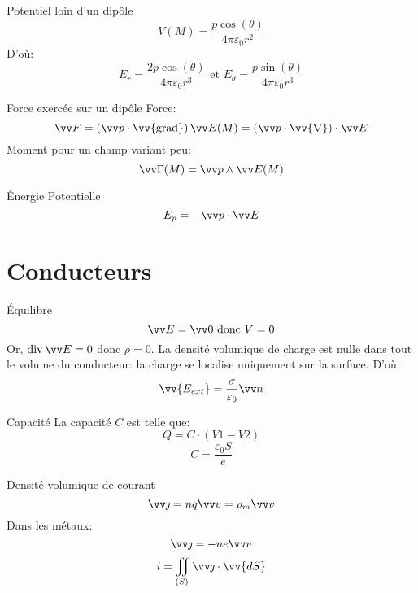 \documentclass[french, a4paper, 11pt, twocolumn]{article}
\newcommand{\po}{\left(}         %
\newcommand{\pf}{\right)}        %
\newcommand{\pof}[1]{\po #1 \pf} %
\newcommand{\vect}[1]{\vv{#1}}
\newcommand{\vabla}{\vect{\nabla}}    %
\newcommand{\grad}{\vect{\mathrm{grad}}}  %
\DeclareMathOperator{\diverg}{div}        %
\begin{document}
\begin{cadre}{Potentiel loin d'un dipôle}
  \[V(M) = \dfrac{p\cos(\theta)}{4\pi\varepsilon_{0}r^{2}}\]
  D'où:
  \[E_{r} = \dfrac{2p\cos(\theta)}{4\pi\varepsilon_{0}r^{3}}\text{ et } E_{\theta} = \dfrac{p\sin(\theta)}{4\pi\varepsilon_{0}r^{3}}\]
\end{cadre}

\begin{cadre}{Force exercée sur un dipôle}
  Force:
  \[\vv F = \pof{\vv p \cdot \grad}\vv E(M) = \po\vv p\cdot\vabla\pf\cdot\vv E\]
  Moment pour un champ variant peu:
  \[\vv\Gamma(M) = \vv p \wedge \vv E(M)\]
\end{cadre}

\begin{cadre}{Énergie Potentielle}
  \[E_{p} = -\vv p\cdot \vv E\]
\end{cadre}

\section{Conducteurs}
\begin{cadre}{Équilibre}
  \[\vv E = \vv 0 \text{ donc } V = 0\]
  Or, $\diverg \vv E = 0$ donc $\rho = 0$. La densité volumique de charge est nulle dans tout le volume du conducteur: la charge se localise uniquement sur la surface.
  D'où:
  \[\vv {E_{ext}} = \dfrac{\sigma}{\varepsilon_{0}}\vv n\]
\end{cadre}

\begin{figure}[h]
  \centering
\end{figure}
\begin{cadre}{Capacité}
  La capacité $C$ est telle que:
  \[Q = C\cdot\pof{V1 - V2}\]
  \[C = \dfrac{\varepsilon_{0}S}{e}\]
\end{cadre}

\begin{cadre}{Densité volumique de courant}
  \[\vv \jmath = nq\vv v = \rho_{m}\vv v\]
  Dans les métaux:
  \[\vv \jmath = -ne\vv v\]
  \[i = \iint_{(S)}\vv\jmath\cdot\vv{dS}\]
\end{cadre}
\end{document}
